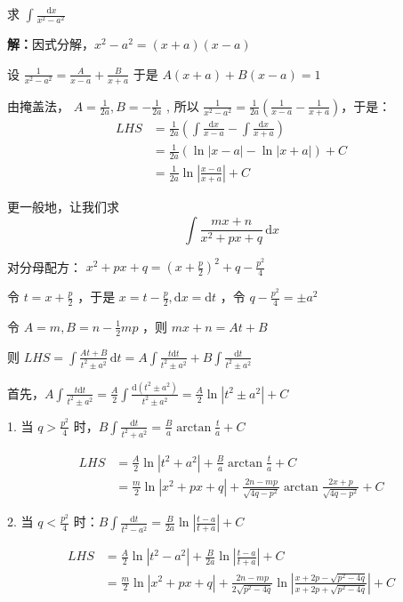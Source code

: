 \begin{example}{}
求 $\displaystyle{\int \frac{\,\mathrm{d}x}{x^2-a^2}}$

\textbf{解：}因式分解，\(x^2-a^2=(x+a)(x-a)\)

设 $\displaystyle{\frac{1}{x^2-a^2}=\frac{A}{x-a}+\frac{B}{x+a}}$ 于是 \(A(x+a)+B(x-a)=1\)

由掩盖法， $\displaystyle{A=\frac{1}{2a},B=-\frac{1}{2a}}$ , 所以 $\displaystyle{\frac{1}{x^2-a^2}=\frac{1}{2a}\left(\frac{1}{x-a}-\frac{1}{x+a} \right)}$，于是：
\begin{equation}\begin{aligned}
LHS&=\frac{1}{2a}\left(\int\frac{\mathrm{d}x}{x-a}-\int\frac{\mathrm{d}x}{x+a}\right)\\&=\frac{1}{2a}\left(\ln|x-a|-\ln|x+a|\right)+C \\&=\frac{1}{2a}\ln\left|\frac{x-a}{x+a}\right|+C
\end{aligned}\end{equation}


更一般地，让我们求
$$\int\frac{mx+n}{x^2+px+q}\,\mathrm{d}x$$

对分母配方： $\displaystyle{x^2+px+q=\left(x+\frac{p}{2}\right)^2+q-\frac{p^2}{4}}$

令 $\displaystyle{t=x+\frac{p}{2}}$ ，于是 $\displaystyle{x=t-\frac{p}{2},\mathrm{d}x=\mathrm {d}t}$ ，令 $\displaystyle{q-\frac{p^2}{4}=\pm a^2}$

令 $\displaystyle{A=m,B=n-\frac{1}{2}mp}$ ，则 \(mx+n=At+B\)

则 $\displaystyle{LHS=\int\frac{At+B}{t^2\pm a^2}\,\mathrm{d}t =A\int\frac{t\mathrm{d}t}{t^2\pm a^2}+B\int\frac{\mathrm{d}t}{t^2\pm a^2}}$

首先，$\displaystyle{A\int\frac{t\mathrm{d}t}{t^2\pm a^2}=\frac{A}{2}\int\frac{\mathrm{d}\left(t^2\pm a^2\right)}{t^2\pm a^2}=\frac{A}{2}\ln\left|t^2\pm a^2\right|+C}$

1. 当 $\displaystyle{q>\frac{p^2}{4}}$ 时，$\displaystyle{B\int\frac{\mathrm{d}t}{t^2+ a^2}=\frac{B}{a}\arctan{\frac{t}{a}}+C}$

\begin{equation}\begin{aligned}
LHS&=\frac{A}{2}\ln\left|t^2+ a^2\right|+\frac{B}{a}\arctan{\frac{t}{a}}+C \\&=\frac{m}{2}\ln\left|x^2+px+q\right|+\frac{2n-mp}{\sqrt{4q-p^2}}\arctan{\frac{2x+p}{\sqrt{4q-p^2}}}+C
\end{aligned}\end{equation}

2. 当 $\displaystyle{q<\frac{p^2}{4}}$ 时：$\displaystyle{B\int\frac{\mathrm{d}t}{t^2- a^2}=\frac{B}{2a}\ln\left|\frac{t-a}{t+a}\right|+C}$ 

\begin{equation}\begin{aligned}
LHS&=\frac{A}{2}\ln\left|t^2- a^2\right|+\frac{B}{2a}\ln\left|\frac{t-a}{t+a}\right|+C \\&=\frac{m}{2}\ln\left|x^2+px+q\right|+\frac{2n-mp}{2\sqrt{p^2-4q}}\ln\left|\frac{x+2p-\sqrt{p^2-4q}}{x+2p+\sqrt{p^2-4q}}\right|+C
\end{aligned}\end{equation}
\end{example}
